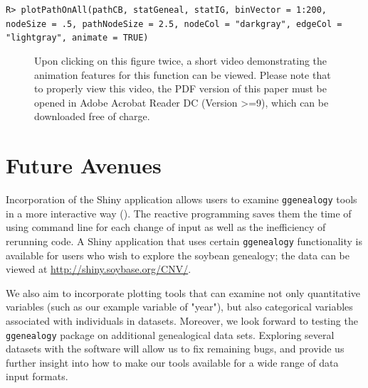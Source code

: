 \documentclass[11pt,a4paper,oldfontcommands,openany]{memoir}
\DeclareRobustCommand{\mybox}[2][gray!15]{%
\begin{tcolorbox}[   %
        breakable,
        left=0pt,
        right=0pt,
        top=0pt,
        bottom=0pt,
        colback=#1,
        colframe=#1,
        width=\dimexpr\textwidth\relax, 
        enlarge left by=0mm,
        boxsep=5pt,
        arc=0pt,outer arc=0pt,
        ]
        #2
\end{tcolorbox}
}
\numberwithin{equation}{section} %
\newcommand{\pkg}[1]{{\texttt{#1}}}
\begin{document}
\mybox{
\texttt{R> plotPathOnAll(pathCB, statGeneal, statIG, binVector = 1:200, nodeSize = .5, pathNodeSize = 2.5, nodeCol = "darkgray", edgeCol = "lightgray", animate = TRUE)}
}

\begin{figure}[H]
    \centering
    \caption{Upon clicking on this figure twice, a short video demonstrating the animation features for this function can be viewed. Please note that to properly view this video, the PDF version of this paper must be opened in Adobe Acrobat Reader DC (Version >=9), which can be downloaded free of charge.}
    \label{fig:plotAnimate}
\end{figure}

\section{Future Avenues}

Incorporation of the Shiny application allows users to examine \pkg{ggenealogy} tools in a more interactive way (\citealt{shiny}). The reactive programming saves them the time of using command line for each change of input as well as the inefficiency of rerunning code. A Shiny application that uses certain \pkg{ggenealogy} functionality is available for users who wish to explore the soybean genealogy; the data can be viewed at \url{http://shiny.soybase.org/CNV/}.

We also aim to incorporate plotting tools that can examine not only quantitative variables (such as our example variable of "year"), but also categorical variables associated with individuals in datasets. Moreover, we look forward to testing the \pkg{ggenealogy} package on additional genealogical data sets. Exploring several datasets with the software will allow us to fix remaining bugs, and provide us further insight into how to make our tools available for a wide range of data input formats. 
\end{document}
